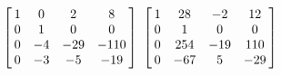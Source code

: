 {$\left[\hskip -3pt \begin{array}{cccc} 1&0&2&8\\  0&1&0&0
\\  0&-4&-29&-110\\  0&-3&-5&-19
\end{array}\hskip -3pt \right] $ 
}
{$ \left[\hskip -3pt \begin{array}{cccc} 1&28&-2&12\\  0&1&0&0
\\  0&254&-19&110\\  0&-67&5&-29
\end{array}\hskip -3pt \right]$}
